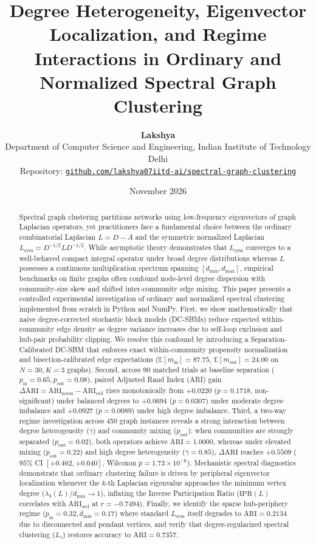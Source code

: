 \documentclass[10pt,twocolumn,a4paper]{article}
\title{\vspace{-8mm}\textbf{Degree Heterogeneity, Eigenvector Localization, and Regime Interactions in Ordinary and Normalized Spectral Graph Clustering}}
\author{
  \textbf{Lakshya}\\
  Department of Computer Science and Engineering, Indian Institute of Technology Delhi\\
  Repository: \href{https://github.com/lakshya07iitd-ai/spectral-graph-clustering}{\texttt{github.com/lakshya07iitd-ai/spectral-graph-clustering}}
}
\date{November 2026}
\begin{document}
\sloppy

\maketitle

\begin{abstract}
Spectral graph clustering partitions networks using low-frequency eigenvectors of graph Laplacian operators, yet practitioners face a fundamental choice between the ordinary combinatorial Laplacian $L = D - A$ and the symmetric normalized Laplacian $L_{\mathrm{sym}} = D^{-1/2} L D^{-1/2}$. While asymptotic theory demonstrates that $L_{\mathrm{sym}}$ converges to a well-behaved compact integral operator under broad degree distributions whereas $L$ possesses a continuous multiplication spectrum spanning $[d_{\min}, d_{\max}]$, empirical benchmarks on finite graphs often confound node-level degree dispersion with community-size skew and shifted inter-community edge mixing. This paper presents a controlled experimental investigation of ordinary and normalized spectral clustering implemented from scratch in Python and NumPy. First, we show mathematically that naive degree-corrected stochastic block models (DC-SBMs) reduce expected within-community edge density as degree variance increases due to self-loop exclusion and hub-pair probability clipping. We resolve this confound by introducing a Separation-Calibrated DC-SBM that enforces exact within-community propensity normalization and bisection-calibrated edge expectations ($\mathbb{E}[m_{\mathrm{in}}] = 87.75$, $\mathbb{E}[m_{\mathrm{out}}] = 24.00$ on $N=30, K=3$ graphs). Second, across 90 matched trials at baseline separation ($p_{\mathrm{in}}=0.65, p_{\mathrm{out}}=0.08$), paired Adjusted Rand Index (ARI) gain $\Delta\mathrm{ARI} = \mathrm{ARI}_{\mathrm{norm}} - \mathrm{ARI}_{\mathrm{ord}}$ rises monotonically from $+0.0220$ ($p = 0.1718$, non-significant) under balanced degrees to $+0.0694$ ($p = 0.0307$) under moderate degree imbalance and $+0.0927$ ($p = 0.0089$) under high degree imbalance. Third, a two-way regime investigation across 450 graph instances reveals a strong interaction between degree heterogeneity ($\gamma$) and community mixing ($p_{\mathrm{out}}$): when communities are strongly separated ($p_{\mathrm{out}}=0.02$), both operators achieve $\mathrm{ARI} = 1.0000$, whereas under elevated mixing ($p_{\mathrm{out}}=0.22$) and high degree heterogeneity ($\gamma=0.85$), $\Delta\mathrm{ARI}$ reaches $+0.5509$ ($95\%$ CI $[+0.462, +0.640]$, Wilcoxon $p = 1.73\times 10^{-6}$). Mechanistic spectral diagnostics demonstrate that ordinary clustering failure is driven by peripheral eigenvector localization whenever the $k$-th Laplacian eigenvalue approaches the minimum vertex degree ($\lambda_3(L)/d_{\min} \to 1$), inflating the Inverse Participation Ratio ($\mathrm{IPR}(L)$ correlates with $\mathrm{ARI}_{\mathrm{ord}}$ at $r = -0.7494$). Finally, we identify the sparse hub-periphery regime ($p_{\mathrm{in}}=0.32, \bar{d}_{\min}=0.17$) where standard $L_{\mathrm{sym}}$ itself degrades to $\mathrm{ARI}=0.2134$ due to disconnected and pendant vertices, and verify that degree-regularized spectral clustering ($L_\tau$) restores accuracy to $\mathrm{ARI}=0.7357$.
\end{abstract}
\end{document}
